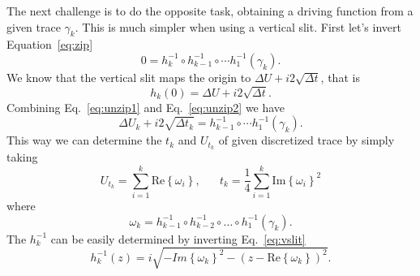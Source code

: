 The next challenge is to do the opposite task, obtaining a driving function
from a given trace $\gamma_k$. This is much simpler when using a vertical slit.
First let's invert Equation~\ref{eq:zip}
\begin{equation}
    \label{eq:unzip1}
    0=h_{k}^{-1}\circ h_{k-1}^{-1}\circ\cdots h_{1}^{-1}\left(\gamma_{k}\right).
\end{equation}
We know that the vertical slit maps the origin to $\Delta U+i2\sqrt{\Delta t}$,
that is
\begin{equation}
    \label{eq:unzip2}
    h_{k}\left(0\right)=\Delta U+i2\sqrt{\Delta t}.
\end{equation}
Combining Eq.~\ref{eq:unzip1} and Eq.~\ref{eq:unzip2} we have    
\begin{equation}
    \Delta U_{k}+i2\sqrt{\Delta t_{k}}=
    h_{k-1}^{-1}\circ\cdots h_{1}^{-1}\left(\gamma_{k}\right).
\end{equation}
This way we can determine the $t_k$ and $U_{t_k}$ of given discretized
trace by simply taking
\begin{equation}
    U_{t_k}=\sum_{i=1}^{k}\mbox{Re}\left\{ \omega_{i}\right\},
    \,\,\,\,\,\,\,\,\,\,
    t_{k}=\frac{1}{4}\sum_{i=1}^{k}\mbox{Im}\left\{ \omega_{i}\right\} ^{2}
\end{equation}
where
\begin{equation}
    \omega_{k}=h_{k-1}^{-1}\circ h_{k-2}^{-1}\circ
        \ldots\circ h_{1}^{-1}\left(\gamma_{k}\right).
\end{equation}
The $h_k^{-1}$ can be easily determined by inverting Eq.~\ref{eq:vslit}
\begin{equation}
    h_{k}^{-1}\left(z\right)=
    i\sqrt{-Im{\left\{ \omega_{k}\right\}}^{2}
           -{\left(z-\mbox{Re}\left\{ \omega_{k}\right\} \right)}^{2}}.
\end{equation}


